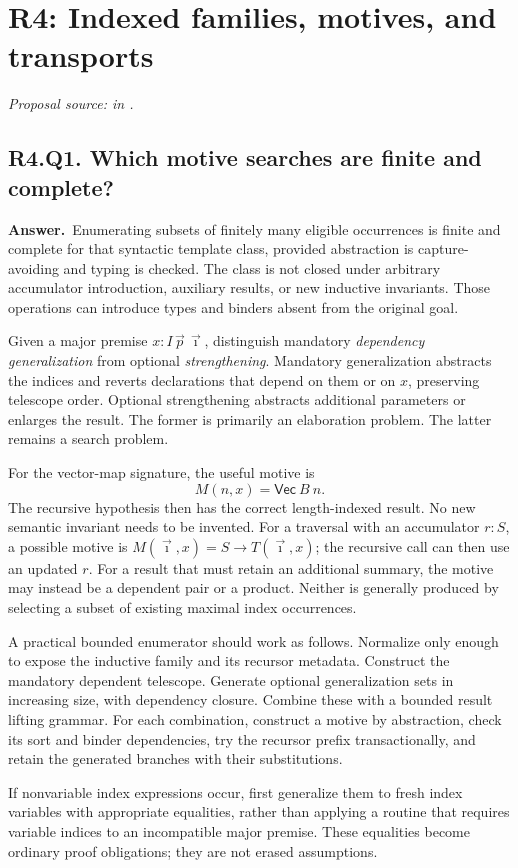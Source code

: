 \documentclass[11pt,a4paper]{article}
\theoremstyle{definition}
\theoremstyle{remark}
\newcommand{\answer}{\par\noindent\textbf{Answer.}\ }
\newcommand{\sourcepart}[1]{\par\noindent\textit{Proposal source: #1 in \cite{proposal}.}}
\newcommand{\qheading}[2]{\subsection{#1. #2}}
\begin{document}
\section{R4: Indexed families, motives, and transports}
\label{sec:r4}
\sourcepart{}

\qheading{R4.Q1}{Which motive searches are finite and complete?}
\answer Enumerating subsets of finitely many eligible occurrences is finite
and complete for that syntactic template class, provided abstraction is
capture-avoiding and typing is checked. The class is not closed under arbitrary
accumulator introduction, auxiliary results, or new inductive invariants.
Those operations can introduce types and binders absent from the original goal.

Given a major premise $x:I\,\vec p\,\vec\imath$, distinguish mandatory
\emph{dependency generalization} from optional \emph{strengthening}. Mandatory
generalization abstracts the indices and reverts declarations that depend on
them or on $x$, preserving telescope order. Optional strengthening abstracts
additional parameters or enlarges the result. The former is primarily an
elaboration problem. The latter remains a search problem.

For the vector-map signature, the useful motive is
\[
 M(n,x)=\mathsf{Vec}\ B\ n.
 \tag{14}
\]
The recursive hypothesis then has the correct length-indexed result. No new
semantic invariant needs to be invented. For a traversal with an accumulator
$r:S$, a possible motive is
$M(\vec\imath,x)=S\to T(\vec\imath,x)$; the recursive call can then use an
updated $r$. For a result that must retain an additional summary, the motive
may instead be a dependent pair or a product. Neither is generally produced
by selecting a subset of existing maximal index occurrences.

A practical bounded enumerator should work as follows. Normalize only enough
to expose the inductive family and its recursor metadata. Construct the
mandatory dependent telescope. Generate optional generalization sets in
increasing size, with dependency closure. Combine these with a bounded result
lifting grammar. For each combination, construct a motive by abstraction,
check its sort and binder dependencies, try the recursor prefix transactionally,
and retain the generated branches with their substitutions.

If nonvariable index expressions occur, first generalize them to fresh index
variables with appropriate equalities, rather than applying a routine that
requires variable indices to an incompatible major premise. These equalities
become ordinary proof obligations; they are not erased assumptions.
\end{document}
